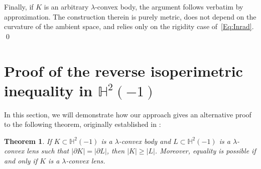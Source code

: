 \documentclass[12pt]{amsart}
\newcommand{\Hh}{\mathbb{H}}
\renewcommand{\ge}{\geqslant}
\theoremstyle{theorem}
\newtheorem{theorem}{Theorem}[section]
\theoremstyle{Intro}
\theoremstyle{definition}
\theoremstyle{remark}
\theoremstyle{claim}
\numberwithin{equation}{section}
\begin{document}
Finally, if $K$ is an arbitrary $\lambda$-convex body, the argument follows \cite[Subsection~3.3]{DT} verbatim by approximation. The construction therein is purely metric, does not depend on the curvature of the ambient space, and relies only on the rigidity case of~\eqref{Eq:Inrad}. \qed



\section{Proof of the reverse isoperimetric inequality in $\Hh^2(-1)$}

In this section, we will demonstrate how our approach gives an alternative proof to the following theorem, originally established in \cite{DrLob}:

\begin{theorem}
    If $K \subset \Hh^2(-1)$ is a $\lambda$-convex body and $L \subset \Hh^2(-1)$ is a $\lambda$-convex lens such that $|\partial K| = |\partial L|$, then $|K| \ge |L|$. Moreover, equality is possible if and only if $K$ is a $\lambda$-convex lens.
\end{theorem}
\end{document}
